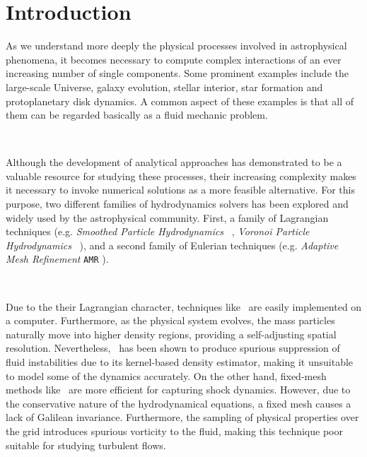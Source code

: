 \documentclass[a4,useAMS,usenatbib,usegraphicx,12pt]{article}
\begin{document}
\newpage


\section{Introduction}
As we understand more deeply the physical processes involved in astrophysical 
phenomena, it becomes necessary to compute complex interactions of an ever 
increasing number of single components. Some prominent examples include 
the large-scale Universe, galaxy evolution, stellar interior, star formation 
and protoplanetary disk dynamics. A common aspect of these examples is that all 
of them can be regarded basically as a fluid mechanic problem.

\

Although the development of analytical approaches has demonstrated to be a
valuable resource for studying these processes, their increasing complexity 
makes it necessary to invoke numerical solutions as a more feasible alternative.
For this purpose, two different families of hydrodynamics solvers has been 
explored and widely used by the astrophysical community. First, a family of 
Lagrangian techniques (e.g. \textit{Smoothed Particle Hydrodynamics} 
\SPH\ \citep{Lucy77,Gingold77}, \textit{Voronoi Particle Hydrodynamics} \VPH\ 
\citep{Hess10}), and a second family of Eulerian techniques (e.g.
\textit{Adaptive Mesh Refinement} \texttt{AMR} \citep{Berger89}).

\

Due to the their Lagrangian character, techniques like \SPH\ are easily 
implemented on a computer. Furthermore, as the physical system evolves, 
the mass particles naturally move into higher density regions, providing a 
self-adjusting spatial resolution. Nevertheless, \SPH\ has been shown to 
produce spurious suppression of fluid instabilities due to its kernel-based 
density estimator, making it unsuitable to model some of the dynamics 
accurately. On the other hand, fixed-mesh methods like \AMR\ are more efficient 
for capturing shock dynamics. However, due to the conservative nature of the 
hydrodynamical equations, a fixed mesh causes a lack of Galilean invariance. 
Furthermore, the sampling of physical properties over the grid introduces 
spurious vorticity to the fluid, making this technique poor suitable for 
studying turbulent flows.

\
\end{document}
